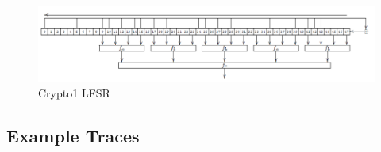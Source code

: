 \documentclass[fleqn,10pt]{SelfArx} %
\begin{document}
\begin{figure}[h]
  \includegraphics[width=\linewidth]{img/lfsr.png}
  \caption{Crypto1 LFSR \cite{classicvulnerabilities}}
  \label{fig:lfsr}
\end{figure}


\subsection{Example Traces}
\end{document}
